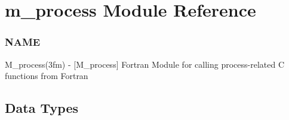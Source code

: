 \hypertarget{namespacem__process}{}\section{m\+\_\+process Module Reference}
\label{namespacem__process}


\subsubsection*{N\+A\+ME}

M\+\_\+process(3fm) -\/ \mbox{[}M\+\_\+process\mbox{]} Fortran Module for calling process-\/related C functions from Fortran  


\subsection*{Data Types}
